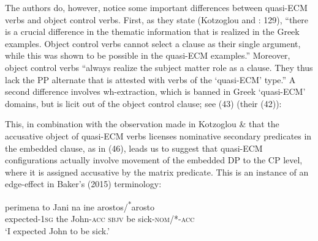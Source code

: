 \documentclass[output=paper]{langsci/langscibook}
\begin{document}
    \z

The authors do, however, notice some important differences between quasi-ECM verbs and object control verbs. First, as they state (Kotzoglou and \citealt{Papangeli2007}: 129), “there is a crucial difference in the thematic information that is realized in the Greek examples. Object control verbs cannot select a clause as their single argument, while this was shown to be possible in the quasi-ECM examples.” Moreover, object control verbs “always realize the subject matter role as a clause. They thus lack the PP alternate that is attested with verbs of the ‘quasi-ECM’ type.” A second difference involves wh-extraction, which is banned in Greek ‘quasi-ECM’ domains, but is licit out of the object control clause; see (43) (their (42)):

\ea%
    \label{ex:alexiadou:43}
    \z
\z

This, in combination with the observation made in Kotzoglou \& \citet{Papangeli2007} that the accusative object of quasi-ECM verbs licenses nominative secondary predicates in the embedded clause, as in (46), leads us to suggest that quasi-ECM configurations actually involve movement of the embedded DP to the CP level, where it is assigned accusative by the matrix predicate. This is an instance of an edge-effect in Baker’s (2015) terminology:

\ea%
    \label{ex:alexiadou:46}
    \gll perimena        to Jani           na    ine arostos/\textsuperscript{*}arosto \\
         expected{}-\textsc{1sg} the John\textsc{{}-acc} \textsc{sbjv} be sick\textsc{{}-nom}/*\textsc{{}-acc} \\
    \glt ‘I expected John to be sick.’ 
    \z
\end{document}
